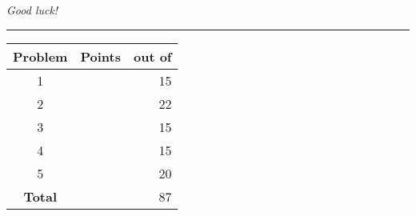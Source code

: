 \documentclass[12pt]{article}                   %
\begin{document}
\begin{minipage}{8cm}
\emph{Good luck!}
\end{minipage}\hfil\begin{minipage}[t]{6cm}
\rule{1cm}{0pt}\begin{tabular}{|c|l|@{/}r|}
\hline
{\bf Problem} & Points & out of \\ \hline
1 & & 15\\ \hline
2 & & 22\\ \hline
3 & & 15\\ \hline
4 & & 15\\ \hline
5 & & 20\\ \hline
{\bf Total} & & 87 \\ \hline
\end{tabular}
\end{minipage}

\vfill\thispagestyle{empty}
\newpage



\end{document}
